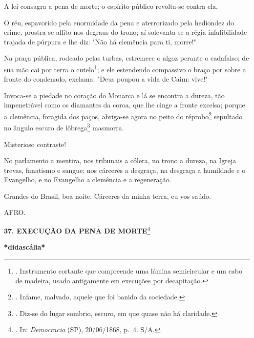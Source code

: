 A lei consagra a pena de morte; o espírito público revolta-se contra
ela.

O réu, espavorido pela enormidade da pena e aterrorizado pela hediondez
do crime, prostra-se aflito nos degraus do trono; aí solevanta-se a
régia infalibilidade trajada de púrpura e lhe diz: "Não há clemência
para ti, morre!"

Na praça pública, rodeado pelas turbas, estremece o algoz perante o
cadafalso; de sua mão cai por terra o cutelo\footnote{. Instrumento
  cortante que compreende uma lâmina semicircular e um cabo de madeira,
  usado antigamente em execuções por decapitação.}; e ele estendendo
compassivo o braço por sobre a fronte do condenado, exclama: "Deus
poupou a vida de Caim: vive!"

Invoca-se a piedade no coração do Monarca e lá se encontra a dureza, tão
impenetrável como os diamantes da coroa, que lhe cinge a fronte excelsa;
porque a clemência, foragida dos paços, abriga-se agora no peito do
réprobo\footnote{. Infame, malvado, aquele que foi banido da sociedade.}
sepultado no ângulo escuro de lôbrega\footnote{. Diz-se do lugar
  sombrio, escuro, em que quase não há claridade.} masmorra.

Misterioso contraste!

No parlamento a mentira, nos tribunais a cólera, no trono a dureza, na
Igreja trevas, fanatismo e sangue; nos cárceres a desgraça, na desgraça
a humildade e o Evangelho, e no Evangelho a clemência e a regeneração.

Grandes do Brasil, boa noite. Cárceres da minha terra, eu vos saúdo.

AFRO.

\textbf{37. EXECUÇÃO DA PENA DE MORTE}\footnote{. In: \emph{Democracia}
  (SP), 20/06/1868, p.~4. S/A.}

\textbf{*didascália*}

